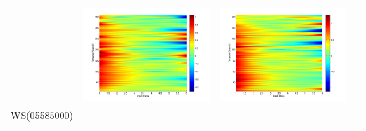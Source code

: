 \documentclass[11pt]{article}
\begin{document}
\begin{table}[H]
{\begin{tabular}{cccc}
&\begin{minipage}{.3\textwidth}\includegraphics[width=\linewidth]{resultgraph/02143000epdiff_former.png}\end{minipage}
&\begin{minipage}{.3\textwidth}\includegraphics[width=\linewidth]{resultgraph/02143000qdiff_former.png}\end{minipage}
\\
WS(05585000)

\end{tabular}}
\end{table}
\end{document}
